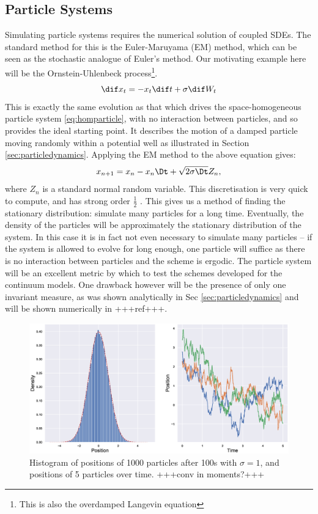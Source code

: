 \subsection{Particle Systems}\label{sec:particlemethods}
Simulating particle systems requires the numerical solution of coupled SDEs. The standard method for this is the Euler-Maruyama (EM) method, which can be seen as the stochastic analogue of Euler's method. Our motivating example here will be the Ornstein-Uhlenbeck process\footnote{This is also the overdamped Langevin equation}. 
\begin{equation}
\dif x_t = - x_t \dif t + \sigma \dif W_t
\end{equation}
This is exactly the same evolution as that which drives the space-homogeneous particle system \eqref{eq:homparticle}, with no interaction between particles, and so provides the ideal starting point. It describes the motion of a damped particle moving randomly within a potential well as illustrated in Section \ref{sec:particledynamics}. Applying the EM method to the above equation gives:
\[ x_{n+1} = x_n -  x_n\Dt + \sqrt{2\sigma\Dt}Z_n,  \]
where $Z_n$ is a standard normal random variable. This discretisation is very quick to compute, and has strong order $\frac{1}{2}$ \cite{Higham01}. This gives us a method of finding the stationary distribution: simulate many particles for a long time. Eventually, the density of the particles will be approximately the stationary distribution of the system. In this case it is in fact not even necessary to simulate many particles -- if the system is allowed to evolve for long enough, one particle will suffice as there is no interaction between particles and the scheme is ergodic. The particle system will be an excellent metric by which to test the schemes developed for the continuum models. One drawback however will be the presence of only one invariant measure, as was shown analytically in Sec \ref{sec:particledynamics} and will be shown numerically in +++ref+++.
\begin{figure}
    \centering
    \includegraphics[width=0.7\linewidth]{Figures/OUparticletraj}
    \caption{Histogram of positions of 1000 particles after 100s with $\sigma = 1$, and positions of 5 particles over time. +++conv in moments?+++}
    \label{fig:ouparticletraj}
\end{figure}

